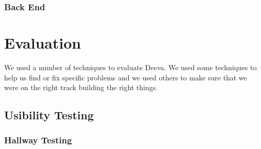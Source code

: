 \documentclass[11pt, a4paper]{article}
\begin{document}
\subsubsection{Back End}

\section{Evaluation}
\label{sec:evaluation}
We used a number of techniques to evaluate Deeva.
We used some techniques to help us find or fix specific problems and we used others to make sure that we were on the right track building the right things.
\subsection{Usibility Testing}

\subsubsection{Hallway Testing}
\begin{figure}[h!]
\centering
{}
\quad
{}
\end{figure}
\end{document}
